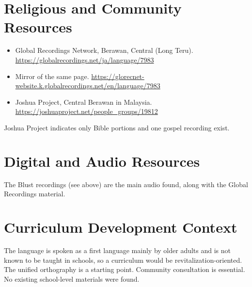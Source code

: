 \documentclass[12pt]{article}
\begin{document}
\section{Religious and Community Resources}
\begin{itemize}
\item Global Recordings Network, Berawan, Central (Long Teru). \url{https://globalrecordings.net/ja/language/7983}
\item Mirror of the same page. \url{https://glorecnet-website.k.globalrecordings.net/en/language/7983}
\item Joshua Project, Central Berawan in Malaysia. \url{https://joshuaproject.net/people_groups/19812}
\end{itemize}
Joshua Project indicates only Bible portions and one gospel recording exist.

\section{Digital and Audio Resources}
The Blust recordings (see above) are the main audio found, along with the Global Recordings material.

\section{Curriculum Development Context}
The language is spoken as a first language mainly by older adults and is not known to be taught in schools, so a curriculum would be revitalization-oriented. The unified orthography is a starting point. Community consultation is essential. No existing school-level materials were found.
\end{document}
